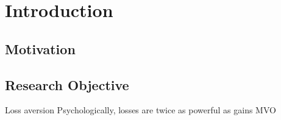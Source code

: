 \chapter{Introduction}

\section {Motivation}
\section {Research Objective}
Loss aversion Psychologically, losses are twice as powerful as gains \cite{Tversky1992}
MVO \cite {10.2307/2975974}
\label{c:intro}

